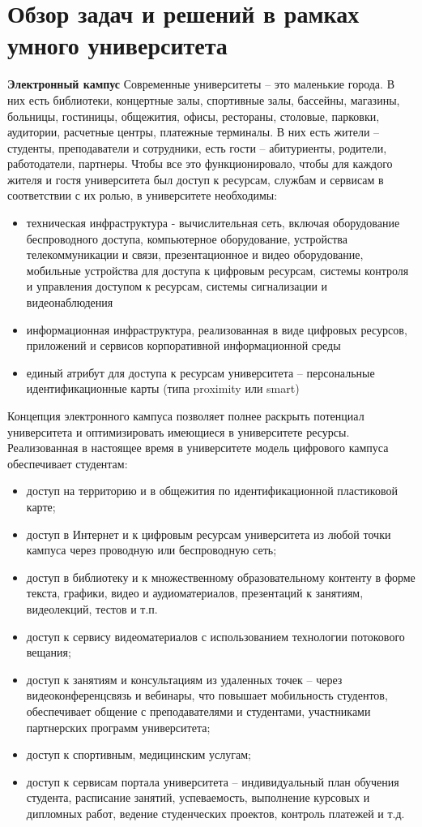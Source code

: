 
\section{Обзор задач и решений в рамках умного университета}

\textbf{Электронный кампус}
Современные университеты – это маленькие города.\cite{Cisco} В них есть библиотеки, концертные залы, спортивные залы, бассейны, магазины, больницы, гостиницы, общежития, офисы, рестораны, столовые, парковки, аудитории, расчетные центры, платежные терминалы. В них есть жители – студенты, преподаватели и сотрудники, есть гости – абитуриенты, родители, работодатели, партнеры. Чтобы все это функционировало, чтобы для каждого жителя и гостя университета был доступ к ресурсам, службам и сервисам в соответствии с их ролью,  в университете необходимы:
 \begin{itemize}
	\item техническая инфраструктура - вычислительная сеть, включая оборудование беспроводного доступа, компьютерное оборудование, устройства телекоммуникации и связи, презентационное и видео оборудование, мобильные устройства для доступа к цифровым ресурсам,  системы контроля и управления доступом к ресурсам, системы сигнализации и видеонаблюдения
	\item информационная инфраструктура, реализованная в виде цифровых ресурсов, приложений и сервисов корпоративной информационной среды
	\item единый атрибут для доступа к ресурсам университета – персональные идентификационные карты  (типа proximity или smart)
\end{itemize}
Концепция электронного кампуса позволяет полнее раскрыть потенциал университета и оптимизировать имеющиеся в университете ресурсы. Реализованная в настоящее время в университете модель  цифрового  кампуса обеспечивает студентам:
\begin{itemize}
	\item доступ на территорию и  в общежития по  идентификационной пластиковой карте;
	\item доступ в Интернет и к цифровым ресурсам университета из любой точки кампуса через проводную или беспроводную сеть;
	\item доступ в библиотеку и к множественному образовательному контенту в форме текста, графики, видео и аудиоматериалов, презентаций к занятиям, видеолекций, тестов  и т.п.
	\item доступ к сервису видеоматериалов с использованием технологии потокового вещания;
	\item доступ к занятиям и консультациям из удаленных точек – через видеоконференцсвязь и вебинары,  что повышает мобильность студентов, обеспечивает общение с преподавателями и студентами, участниками партнерских программ университета;
	\item доступ к спортивным, медицинским услугам;
	\item доступ к сервисам портала университета – индивидуальный план обучения студента, расписание занятий, успеваемость, выполнение курсовых и дипломных работ, ведение студенческих  проектов, контроль платежей и т.д.
\end{itemize}
